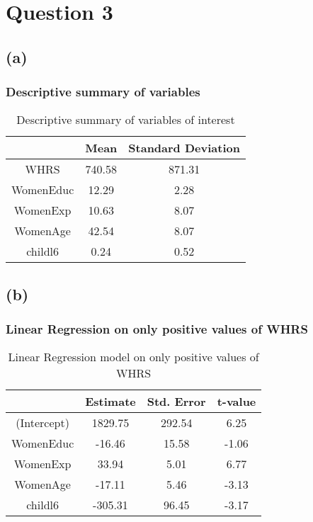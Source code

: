 \documentclass[a4paper]{article}
\begin{document}
\pagebreak
\section*{Question 3}
\subsection*{(a)}

\subsubsection*{Descriptive summary of variables}
\begin{table}[h!]
    \centering
    \begin{tabular}{|ccc|}
    \hline
    \textbf{}   & \textbf{Mean} & \textbf{Standard Deviation} \\ \hline
     WHRS       & 740.58        & 871.31           \\ %
     WomenEduc  & 12.29         & 2.28      \\ %
     WomenExp   & 10.63         & 8.07       \\ %
     WomenAge   & 42.54         & 8.07               \\ %
     childl6    & 0.24         & 0.52                  \\ \hline
    \end{tabular}
    \caption{Descriptive summary of variables of interest}
    \label{tab:summary statistics}
\end{table}


\subsection*{(b)}
\subsubsection*{Linear Regression on only positive values of WHRS}
\begin{table}[!h]
    \centering
    \begin{tabular}{|cccc|}
    \hline
    \textbf{}   & \textbf{Estimate} & \textbf{Std. Error} & \textbf{t-value} \\ \hline
     (Intercept) &     1829.75    &     292.54      & 6.25      \\ %
     WomenEduc  &      -16.46      &       15.58       &  -1.06  \\ %
     WomenExp   &      33.94     &        5.01        & 6.77     \\ %
     WomenAge   &      -17.11     &       5.46       & -3.13     \\ %
     childl6    &       -305.31   &       96.45    & -3.17     \\ \hline
    \end{tabular}
    \caption{Linear Regression model on only positive values of WHRS }
    \label{tab:Linear Regression}
\end{table}
\end{document}
